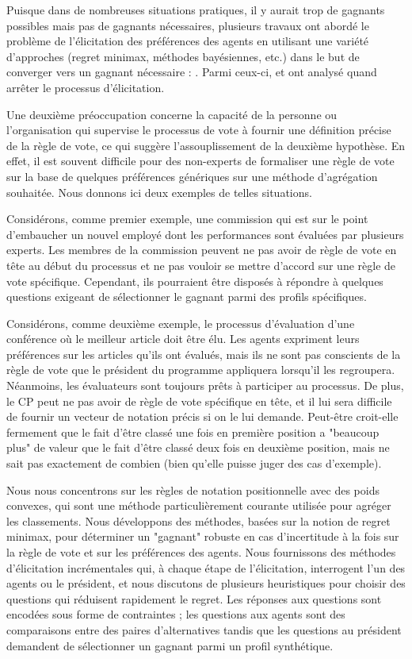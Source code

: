 	Puisque dans de nombreuses situations pratiques, il y aurait trop de gagnants possibles mais pas de gagnants nécessaires, plusieurs travaux ont abordé le problème de l'élicitation des préférences des agents en utilisant une variété d'approches (regret minimax, méthodes bayésiennes, etc.) dans le but de converger vers un gagnant nécessaire : \citep{Naamani-Dery2015,Kalech2011,Lu2011,Pini2009,Benabbou2016,Dey2016_2}. Parmi ceux-ci, \citet{Walsh2009} et \citet{Conitzer2009} ont analysé quand arrêter le processus d'élicitation.

	Une deuxième préoccupation concerne la capacité de la personne ou l'organisation qui supervise le processus de vote à fournir une définition précise de la règle de vote, ce qui suggère l'assouplissement de la deuxième hypothèse. En effet, il est souvent difficile pour des non-experts de formaliser une règle de vote sur la base de quelques préférences génériques sur une méthode d'agrégation souhaitée. 
	Nous donnons ici deux exemples de telles situations.
	
	Considérons, comme premier exemple, une commission qui est sur le point d'embaucher un nouvel employé dont les performances sont évaluées par plusieurs experts. Les membres de la commission peuvent ne pas avoir de règle de vote en tête au début du processus et ne pas vouloir se mettre d'accord sur une règle de vote spécifique. Cependant, ils pourraient être disposés à répondre à quelques questions exigeant de sélectionner le gagnant parmi des profils spécifiques. 
	
	Considérons, comme deuxième exemple, le processus d'évaluation d'une conférence où le meilleur article doit être élu. Les agents expriment leurs préférences sur les articles qu'ils ont évalués, mais ils ne sont pas conscients de la règle de vote que le président du programme appliquera lorsqu'il les regroupera. Néanmoins, les évaluateurs sont toujours prêts à participer au processus. De plus, le CP peut ne pas avoir de règle de vote spécifique en tête, et il lui sera difficile de fournir un vecteur de notation précis si on le lui demande. Peut-être croit-elle fermement que le fait d'être classé une fois en première position a "beaucoup plus" de valeur que le fait d'être classé deux fois en deuxième position, mais ne sait pas exactement de combien (bien qu'elle puisse juger des cas d'exemple).
	
	Nous nous concentrons sur les règles de notation positionnelle avec des poids convexes, qui sont une méthode particulièrement courante utilisée pour agréger les classements. 
	Nous développons des méthodes, basées sur la notion de regret minimax, pour déterminer un "gagnant" robuste en cas d'incertitude à la fois sur la règle de vote et sur les préférences des agents.
	Nous fournissons des méthodes d'élicitation incrémentales qui, à chaque étape de l'élicitation, interrogent l'un des agents ou le président, et nous discutons de plusieurs heuristiques pour choisir des questions qui réduisent rapidement le regret.
	Les réponses aux questions sont encodées sous forme de contraintes ; les questions aux agents sont des comparaisons entre des paires d'alternatives tandis que les questions au président demandent de sélectionner un gagnant parmi un profil synthétique.

